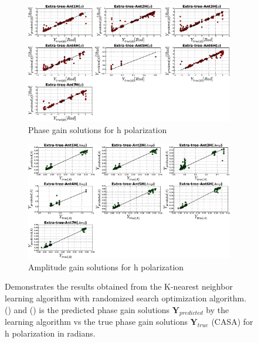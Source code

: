 \begin{figure}[H]
   \centering
    \begin{subfigure}[t]{0.52\textheight}
        
        \includegraphics[width=\textwidth]{images/Extra-treeHphase.eps} 
        \caption{Phase gain solutions for h polarization} \label{A6}
    \end{subfigure}
    
      \begin{subfigure}[t]{0.52\textheight}
       
        \includegraphics[width=\textwidth]{images/Extra-treeHamp.eps} 
        \caption{Amplitude gain solutions for h polarization} \label{B6}
    \end{subfigure}
    \caption{Demonstrates the results obtained from the K-nearest neighbor learning algorithm with randomized search optimization algorithm. () and () is the predicted phase gain solutions $\textbf{Y}_{predicted}$ by the learning algorithm vs the true phase gain solutions $\textbf{Y}_{true}$ (CASA) for h polarization in radians.}
    \end{figure}
    
